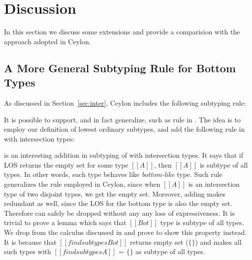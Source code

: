 \section{Discussion}
\label{sec:discussion}
In this section we discuss some extensions and provide a comparision with the approach
adopted in Ceylon. 

\subsection{A More General Subtyping Rule for Bottom  Types}
\label{sec:inter:refactoring}
As discussed in Section~\ref{sec:inter}, Ceylon includes the following subtyping rule:

\begin{center}
\end{center}

\noindent It is possible to support, and in fact generalize, such as rule in \name. The idea is to
employ our definition of lowest ordinary subtypes, and add the following rule 
in \cal with intersection types:

\begin{center}
\end{center}

\noindent {} is an interesting addition in subtyping of \cal with intersection types.
It says that if LOS returns the empty set for some type $[[A]]$, then $[[A]]$
is subtype of all types. In other words, such type behaves like \emph{bottom-like} type.
Such rule generalizes the rule employed in Ceylon, since when $[[A]]$ is an intersection type of two
disjoint types, we get the empty set.
Moreover, adding  makes  redundant as well, since the LOS for
the bottom type is also the empty set. Therefore  can safely be dropped without any
any loss of expressiveness. It is trivial to prove a lemma which says that $[[Bot]]$ type is
subtype of all types. We drop  from the calculus discussed in 
and prove  to show this property instead. It is because that $[[findsubtypes Bot]]$
returns empty set ($\{\}$) and  makes all such types with $[[findsubtypes A]]$ = $\{\}$ as
subtype of all types.

